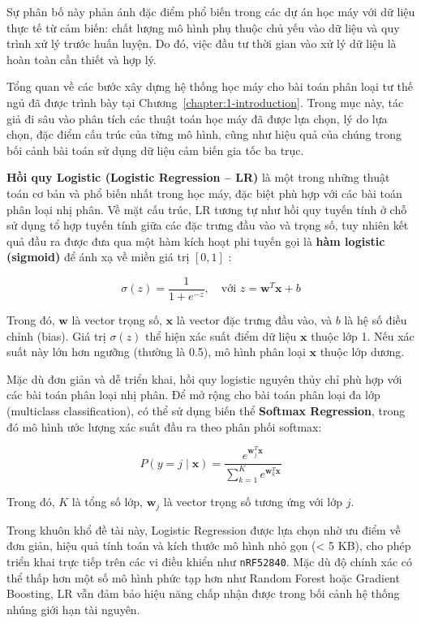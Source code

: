 Sự phân bố này phản ánh đặc điểm phổ biến trong các dự án học máy với 
dữ liệu thực tế từ cảm biến: chất lượng mô hình phụ thuộc chủ yếu vào 
dữ liệu và quy trình xử lý trước huấn luyện. Do đó, việc đầu tư thời 
gian vào xử lý dữ liệu là hoàn toàn cần thiết và hợp lý.

Tổng quan về các bước xây dựng hệ thống học máy cho bài toán phân loại 
tư thế ngủ đã được trình bày tại Chương~\ref{chapter:1-introduction}.
Trong mục này, tác giả đi sâu vào phân tích các thuật toán học máy 
đã được lựa chọn, lý do lựa chọn, đặc điểm cấu trúc của từng mô hình, 
cũng như hiệu quả của chúng trong bối cảnh bài toán sử dụng dữ liệu 
cảm biến gia tốc ba trục.



\textbf{Hồi quy Logistic (Logistic Regression – LR)} là một trong những thuật toán 
cơ bản và phổ biến nhất trong học máy, đặc biệt phù hợp với các 
bài toán phân loại nhị phân. Về mặt cấu trúc, LR tương tự như hồi 
quy tuyến tính ở chỗ sử dụng tổ hợp tuyến tính giữa các đặc trưng 
đầu vào và trọng số, tuy nhiên kết quả đầu ra được đưa qua một hàm 
kích hoạt phi tuyến gọi là \textbf{hàm logistic (sigmoid)} 
để ánh xạ về miền giá trị $[0, 1]$ \cite{cramer2002logistic}:

\begin{equation}
    \sigma(z) = \frac{1}{1 + e^{-z}}, \quad \text{với } z = \mathbf{w}^T \mathbf{x} + b
\end{equation}

Trong đó, $\mathbf{w}$ là vector trọng số, $\mathbf{x}$ là vector đặc trưng đầu vào, và $b$ là hệ số điều chỉnh (bias). Giá trị $\sigma(z)$ thể hiện xác suất điểm dữ liệu $\mathbf{x}$ thuộc lớp 1. Nếu xác suất này lớn hơn ngưỡng (thường là 0.5), mô hình phân loại $\mathbf{x}$ thuộc lớp dương.

Mặc dù đơn giản và dễ triển khai, hồi quy logistic nguyên thủy chỉ phù hợp với các bài toán phân loại nhị phân. Để mở rộng cho bài toán phân loại đa lớp (multiclass classification), có thể sử dụng biến thể \textbf{Softmax Regression}, trong đó mô hình ước lượng xác suất đầu ra theo phân phối softmax:

\begin{equation}
    P(y = j \mid \mathbf{x}) = \frac{e^{\mathbf{w}_j^T \mathbf{x}}}{\sum_{k=1}^{K} e^{\mathbf{w}_k^T \mathbf{x}}}
\end{equation}

Trong đó, $K$ là tổng số lớp, $\mathbf{w}_j$ là vector trọng số tương ứng với lớp $j$.

Trong khuôn khổ đề tài này, Logistic Regression được lựa chọn nhờ ưu 
điểm về đơn giản, hiệu quả tính toán và kích thước mô hình nhỏ gọn 
(< 5 KB), cho phép triển khai trực tiếp trên các vi điều khiển như 
\texttt{nRF52840}. Mặc dù độ chính xác có thể thấp hơn một số mô hình 
phức tạp hơn như Random Forest hoặc Gradient Boosting, LR vẫn đảm bảo 
hiệu năng chấp nhận được trong bối cảnh hệ thống nhúng giới hạn tài 
nguyên.

